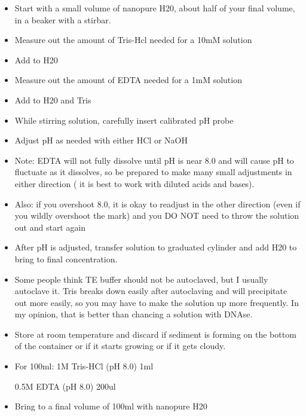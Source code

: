 \documentclass[11pt, oneside]{article}
\begin{document}
		\begin{itemize}

		\itemsep0em

			\item Start with a small volume of nanopure H20, about half of your final volume, in a beaker with a stirbar. 
			\item Measure out the amount of Tris-Hcl needed for a 10mM solution
			\item Add to H20
			\item Measure out the amount of EDTA needed for a 1mM solution
			\item Add to H20 and Tris
			\item While stirring solution, carefully insert calibrated pH probe
			\item Adjust pH as needed with either HCl or NaOH
			\item Note: EDTA will not fully dissolve until pH is near 8.0 and will cause pH to fluctuate as it dissolves, so be prepared to make many 				small adjustments in either direction ( it is best to work with diluted acids and bases). 
			\item Also: if you overshoot 8.0, it is okay to readjust in the other direction (even if you wildly overshoot the mark) and you DO NOT need to 			throw the solution out and start again
			\item After pH is adjusted, transfer solution to graduated cylinder and add H20 to bring to final concentration. 
			\item Some people think TE buffer should not be autoclaved, but I usually autoclave it. Tris breaks down easily after autoclaving and will 				precipitate out more easily, so you may have to make the solution up more frequently. In my opinion, that is better than chancing a solution 			with DNAse. 
			\item Store at room temperature and discard if sediment is forming on the bottom of the container or if it starts growing or if it gets cloudy. 
			\item For 100ml: \hspace{2mm} 1M Tris-HCl (pH 8.0) \hspace{2mm} 	1ml

						  \hspace{23mm} 0.5M EDTA (pH 8.0) \hspace{2mm}	200ul
						  	
			\item Bring to a final volume of 100ml with nanopure H20

		\end{itemize}
\end{document}
